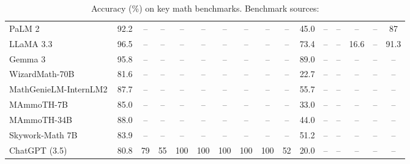 \documentclass[acmsmall,anonymous]{acmart}
\begin{document}
\begin{table*}[ht]
{\begin{tabular}{lccccccccccccccc}
PaLM 2\,\cite{chowdhery2022palm}            & 92.2 & –    & –  & –   & –   & –   & –   & –   & –  & 45.0 & –  & –  & –     & – & 87 \\
LLaMA 3.3\,\cite{llama33}                   & 96.5 & –    & –  & –   & –   & –   & –   & –   & –  & 73.4 & –  & –  & 16.6  & – & 91.3 \\
Gemma 3\,\cite{gemma3}                      & 95.8 & –    & –  & –   & –   & –   & –   & –   & –  & 89.0 & –  & –  & –     & – & – \\
WizardMath-70B\,\cite{luo2025wizardmath}    & 81.6 & –    & –  & –   & –   & –   & –   & –   & –  & 22.7 & –  & –  & –     & – & – \\
MathGenieLM-InternLM2\,\cite{lu2024b}       & 87.7 & –    & –  & –   & –   & –   & –   & –   & –  & 55.7 & –  & –  & –     & – & – \\
MAmmoTH-7B\,\cite{yue2023}                  & 85.0 & –    & –  & –   & –   & –   & –   & –   & –  & 33.0 & –  & –  & –     & – & – \\
MAmmoTH-34B\,\cite{yue2023}                 & 88.0 & –    & –  & –   & –   & –   & –   & –   & –  & 44.0 & –  & –  & –     & – & – \\
Skywork-Math 7B\,\cite{zeng2024}            & 83.9 & –    & –  & –   & –   & –   & –   & –   & –  & 51.2 & –  & –  & –     & – & – \\
ChatGPT (3.5)\,\cite{wei2022chain}          & 80.8 & 79   & 55 & 100 & 100 & 100 & 100 & 100 & 52 & 20.0 & –  & –  & –     & – & – \\ \bottomrule
\end{tabular}}
\caption{Accuracy (\%) on key math benchmarks.  Benchmark sources:}
\label{tab:sota}
\end{table*}


\end{document}
